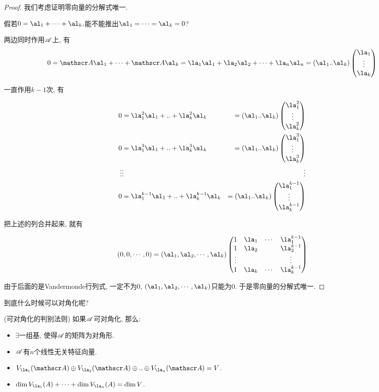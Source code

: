 \begin{proof}
我们考虑证明零向量的分解式唯一. 

假若$0=\al_{1}+\cdots+\al_{k},$能不能推出$\al_{1}=\cdots=\al_{k}=0$?

两边同时作用$\mathscr{A}$上, 有
\[
0=\huaa\al_{1}+\cdots+\huaa\al_{k}=\la_{1}\al_{1}+\la_{2}\al_{2}+\cdots+\la_{n}\al_{n}=(\al_{1}..\al_{k})\begin{pmatrix}\la_{1}\\
\vdots\\
\la_{k}
\end{pmatrix}
\]

一直作用$k-1$次, 有

\begin{align*}
0 & =\la_{1}^{2}\al_{1}+..+\la_{k}^{2}\al_{k} & =(\al_{1}..\al_{k})\begin{pmatrix}\la_{1}^{2}\\
\vdots\\
\la_{k}^{2}
\end{pmatrix}\\
0 & =\la_{1}^{3}\al_{1}+..+\la_{k}^{3}\al_{k} & =(\al_{1}..\al_{k})\begin{pmatrix}\la_{1}^{3}\\
\vdots\\
\la_{k}^{3}
\end{pmatrix}\\
\vdots & \vdots & \vdots\\
0 & =\la_{1}^{k-1}\al_{1}+..+\la_{k}^{k-1}\al_{k} & =(\al_{1}..\al_{k})\begin{pmatrix}\la_{1}^{k-1}\\
\vdots\\
\la_{k}^{k-1}
\end{pmatrix}
\end{align*}

把上述的列合并起来, 就有

\[
(0,0,\cdots,0)=(\al_{1},\al_{2},\cdots,\al_{k})\begin{pmatrix}1 & \la_{1} & \cdots & \la_{1}^{k-1}\\
1 & \la_{2} &  & \la_{2}^{k-1}\\
\vdots &  &  & \vdots\\
1 & \la_{k} & \cdots & \la_{k}^{k-1}
\end{pmatrix}
\]

由于后面的是Vandermonde行列式, 一定不为0, $(\al_{1},\al_{2},\cdots,\al_{k})$只能为0.
于是零向量的分解式唯一. 
\end{proof}
到底什么时候可以对角化呢? 
\begin{thm}
(可对角化的判别法则) 如果$\mathscr{A}$可对角化, 那么:
\begin{itemize}
\item $\exists$一组基, 使得$\mathscr{A}$的矩阵为对角形. 
\item $\mathscr{A}$有$n$个线性无关特征向量. 
\item $V_{\la_{1}}(\huaa)\oplus V_{\la_{2}}(\huaa)\oplus..\oplus V_{\la_{n}}(\huaa)=V$. 
\item $\dim V_{\la_{1}}(A)+\cdots+\dim V_{\la_{n}}(A)=\dim V$.
\end{itemize}
\end{thm}
